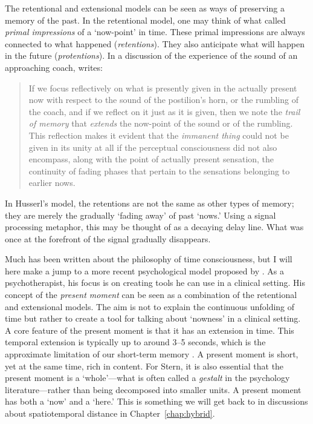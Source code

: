 The retentional and extensional models can be seen as ways of preserving a memory of the past. In the retentional model, one may think of what \citet{husserl_phenomenology_1991} called \emph{primal impressions} of a `now-point' in time. These primal impressions are always connected to what happened (\emph{retentions}). They also anticipate what will happen in the future (\emph{protentions}). In a discussion of the experience of the sound of an approaching coach, \citet[p. 290]{husserl_phenomenology_1991} writes:

\begin{quotation}
If we focus reflectively on what is presently given in the actually present now with respect to the sound of the postilion’s horn, or the rumbling of the coach, and if we reflect on it just as it is given, then we note the \emph{trail of memory} that \emph{extends} the now-point of the sound or of the rumbling. This reflection makes it evident that the \emph{immanent thing} could not be given in its unity at all if the perceptual consciousness did not also encompass, along with the point of actually present sensation, the continuity of fading phases that pertain to the sensations belonging to earlier nows.
\end{quotation}

In Husserl's model, the retentions are not the same as other types of memory; they are merely the gradually `fading away' of past `nows.' Using a signal processing metaphor, this may be thought of as a decaying delay line. What was once at the forefront of the signal gradually disappears.

Much has been written about the philosophy of time consciousness, but I will here make a jump to a more recent psychological model proposed by \citet{stern_present_2004}. As a psychotherapist, his focus is on creating tools he can use in a clinical setting. His concept of the \emph{present moment} can be seen as a combination of the retentional and extensional models. The aim is not to explain the continuous unfolding of time but rather to create a tool for talking about `nowness' in a clinical setting. A core feature of the present moment is that it has an extension in time. This temporal extension is typically up to around 3--5 seconds, which is the approximate limitation of our short-term memory \citep{snyder_music_2000}. A present moment is short, yet at the same time, rich in content. For Stern, it is also essential that the present moment is a `whole'---what is often called a \emph{gestalt} in the psychology literature---rather than being decomposed into smaller units. A present moment has both a `now' and a `here.' This is something we will get back to in discussions about spatiotemporal distance in Chapter~\ref{chap:hybrid}.

